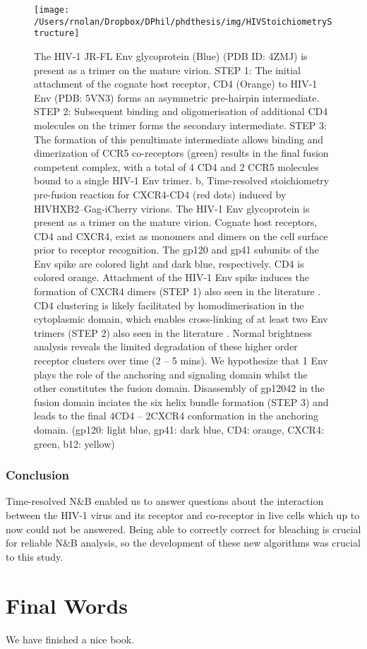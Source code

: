 \documentclass[12pt,]{book}
\theoremstyle{definition}
\theoremstyle{definition}
\theoremstyle{definition}
\theoremstyle{remark}
\begin{document}
\begin{figure}

\texttt{[image: /Users/rnolan/Dropbox/DPhil/phdthesis/img/HIVStoichiometryStructure]} \hfill{}

\caption{The HIV-1 JR-FL Env glycoprotein
(Blue) (PDB ID: 4ZMJ) is present as a trimer on the mature virion. STEP
1: The initial attachment of the cognate host receptor, CD4 (Orange) to
HIV-1 Env (PDB: 5VN3) forms an asymmetric pre-hairpin intermediate. STEP
2: Subsequent binding and oligomerisation of additional CD4 molecules on
the trimer forms the secondary intermediate. STEP 3: The formation of
this penultimate intermediate allows binding and dimerization of CCR5
co-receptors (green) results in the final fusion competent complex, with
a total of 4 CD4 and 2 CCR5 molecules bound to a single HIV-1 Env
trimer. b, Time-resolved stoichiometry pre-fusion reaction for CXCR4-CD4
(red dots) induced by HIVHXB2--Gag-iCherry virions. The HIV-1 Env
glycoprotein is present as a trimer on the mature virion. Cognate host
receptors, CD4 and CXCR4, exist as monomers and dimers on the cell
surface prior to receptor recognition. The gp120 and gp41 subunits of
the Env spike are colored light and dark blue, respectively. CD4 is
colored orange. Attachment of the HIV-1 Env spike induces the formation
of CXCR4 dimers (STEP 1) also seen in the literature \citep{DoKwon}. CD4
clustering is likely facilitated by homodimerisation in the cytoplasmic
domain, which enables cross-linking of at least two Env trimers (STEP 2)
also seen in the literature \citep{Brandenberg2015}. Normal brightness
analysis reveals the limited degradation of these higher order receptor
clusters over time (2 -- 5 mins). We hypothesize that 1 Env plays the
role of the anchoring and signaling domain whilst the other constitutes
the fusion domain. Disassembly of gp12042 in the fusion domain inciates
the six helix bundle formation (STEP 3) and leads to the final 4CD4 --
2CXCR4 conformation in the anchoring domain. (gp120: light blue, gp41:
dark blue, CD4: orange, CXCR4: green, b12: yellow)}\label{fig:HIVStoichiometryStructure}
\end{figure}

\subsection{Conclusion}\label{conclusion}

Time-resolved N\&B enabled us to answer questions about the interaction
between the HIV-1 virus and its receptor and co-receptor in live cells
which up to now could not be answered. Being able to correctly correct
for bleaching is crucial for reliable N\&B analysis, so the development
of these new algorithms was crucial to this study.

\chapter{Final Words}\label{final-words}

We have finished a nice book.


\end{document}
